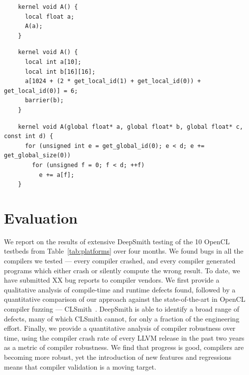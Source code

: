 \newsavebox{\IntelSPIRMetadata}
\begin{lrbox}{\IntelSPIRMetadata}
  \hspace{1.5em}
  \begin{lstlisting}
    kernel void A() {
      local float a;
      A(a);
    }
  \end{lstlisting}
\end{lrbox}

\newsavebox{\IntelRemoveDupeBarrier}
\begin{lrbox}{\IntelRemoveDupeBarrier}
  \hspace{1.5em}
  \begin{lstlisting}
    kernel void A() {
      local int a[10];
      local int b[16][16];
      a[1024 + (2 * get_local_id(1) + get_local_id(0)) + get_local_id(0)] = 6;
      barrier(b);
    }
  \end{lstlisting}
\end{lrbox}

\newsavebox{\IntelCombineRedundant}
\begin{lrbox}{\IntelCombineRedundant}
  \hspace{1.5em}
  \begin{lstlisting}
    kernel void A(global float* a, global float* b, global float* c, const int d) {
      for (unsigned int e = get_global_id(0); e < d; e += get_global_size(0))
        for (unsigned f = 0; f < d; ++f)
          e += a[f];
    }
  \end{lstlisting}
\end{lrbox}


\section{Evaluation}%
\label{sec:eval}

We report on the results of extensive DeepSmith testing of the 10 OpenCL testbeds from Table~\ref{tab:platforms} over four months. We found bugs in all the compilers we tested --- every compiler crashed, and every compiler generated programs which either crash or silently compute the wrong result. To date, we have submitted XX bug reports to compiler vendors. We first provide a qualitative analysis of compile-time and runtime defects found, followed by a quantitative comparison of our approach against the state-of-the-art in OpenCL compiler fuzzing --- CLSmith~\cite{Lidbury2015a}. DeepSmith is able to identify a broad range of defects, many of which CLSmith cannot, for only a fraction of the engineering effort. Finally, we provide a quantitative analysis of compiler robustness over time, using the compiler crash rate of every LLVM release in the past two years as a metric of compiler robustness. We find that progress is good, compilers are becoming more robust, yet the introduction of new features and regressions means that compiler validation is a moving target.

